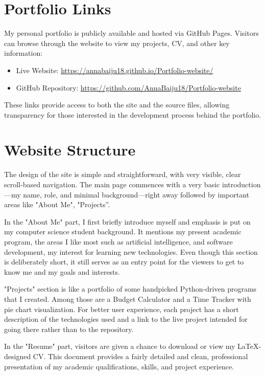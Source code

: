 \documentclass[12pt,a4paper]{article}
\begin{document}
\section{Portfolio Links}
My personal portfolio is publicly available and hosted via GitHub Pages. Visitors can browse through the website to view my projects, CV, and other key information:

\begin{itemize}
    \item Live Website: \url{https://annabaiju18.github.io/Portfolio-website/}
    \item GitHub Repository: \url{https://github.com/AnnaBaiju18/Portfolio-website}
\end{itemize}

These links provide access to both the site and the source files, allowing transparency for those interested in the development process behind the portfolio.

\section{Website Structure}
The design of the site is simple and straightforward, with very visible, clear scroll-based navigation. The main page commences with a very basic introduction—my name, role, and minimal background—right away followed by important areas like "About Me", "Projects”.

In the "About Me" part, I first briefly introduce myself and emphasis is put on my computer science student background. It mentions my present academic program, the areas I like most such as artificial intelligence, and software development, my interest for learning new technologies. Even though this section is deliberately short, it still serves as an entry point for the viewers to get to know me and my goals and interests.

"Projects" section is like a portfolio of some handpicked Python-driven programs that I created. Among those are a Budget Calculator and a Time Tracker with pie chart visualization. For better user experience, each project has a short description of the technologies used and a link to the live project intended for going there rather than to the repository.

In the "Resume" part, visitors are given a chance to download or view my LaTeX-designed CV. This document provides a fairly detailed and clean, professional presentation of my academic qualifications, skills, and project experience.
\end{document}
